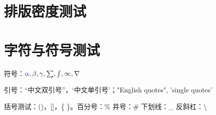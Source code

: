 \documentclass[a4paper,10pt]{ctexart}
\begin{document}
\section*{排版密度测试}

\begin{multicols}{3}
\lipsum[1-2]
\end{multicols}

\section*{字符与符号测试}

符号：$ \textcolor{blue}{\alpha}, \beta, \gamma, \sum, \int, \infty, \nabla $

引号：“中文双引号”，‘中文单引号’；"English quotes", 'single quotes'

括号测试：()，[]，\{ \}。百分号：\% \quad 井号：\# \quad 下划线：\_ \quad 反斜杠：\textbackslash
\end{document}
